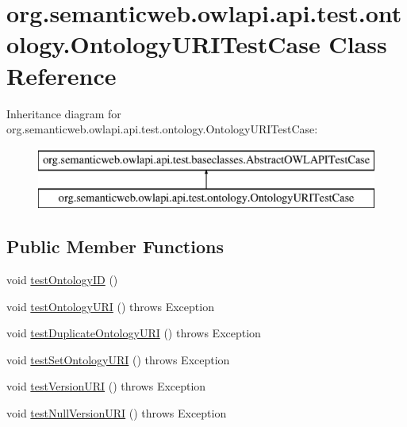 \hypertarget{classorg_1_1semanticweb_1_1owlapi_1_1api_1_1test_1_1ontology_1_1_ontology_u_r_i_test_case}{\section{org.\-semanticweb.\-owlapi.\-api.\-test.\-ontology.\-Ontology\-U\-R\-I\-Test\-Case Class Reference}
\label{classorg_1_1semanticweb_1_1owlapi_1_1api_1_1test_1_1ontology_1_1_ontology_u_r_i_test_case}
}
Inheritance diagram for org.\-semanticweb.\-owlapi.\-api.\-test.\-ontology.\-Ontology\-U\-R\-I\-Test\-Case\-:\begin{figure}[H]
\begin{center}
\leavevmode
\includegraphics[height=2.000000cm]{classorg_1_1semanticweb_1_1owlapi_1_1api_1_1test_1_1ontology_1_1_ontology_u_r_i_test_case}
\end{center}
\end{figure}
\subsection*{Public Member Functions}
\begin{DoxyCompactItemize}
\item 
void \hyperlink{classorg_1_1semanticweb_1_1owlapi_1_1api_1_1test_1_1ontology_1_1_ontology_u_r_i_test_case_a6630c2b5a17ec50983d86ae2e6690acd}{test\-Ontology\-I\-D} ()
\item 
void \hyperlink{classorg_1_1semanticweb_1_1owlapi_1_1api_1_1test_1_1ontology_1_1_ontology_u_r_i_test_case_a1107a0be38634b09862d8e9b27982f42}{test\-Ontology\-U\-R\-I} ()  throws Exception 
\item 
void \hyperlink{classorg_1_1semanticweb_1_1owlapi_1_1api_1_1test_1_1ontology_1_1_ontology_u_r_i_test_case_aa3c99614f62bbc47699d7daf16360b32}{test\-Duplicate\-Ontology\-U\-R\-I} ()  throws Exception 
\item 
void \hyperlink{classorg_1_1semanticweb_1_1owlapi_1_1api_1_1test_1_1ontology_1_1_ontology_u_r_i_test_case_ab7ccf88509b11733fcb7cf8c8ca10abe}{test\-Set\-Ontology\-U\-R\-I} ()  throws Exception 
\item 
void \hyperlink{classorg_1_1semanticweb_1_1owlapi_1_1api_1_1test_1_1ontology_1_1_ontology_u_r_i_test_case_acc1755185d9f9eb8d285679ff40fec7e}{test\-Version\-U\-R\-I} ()  throws Exception 
\item 
void \hyperlink{classorg_1_1semanticweb_1_1owlapi_1_1api_1_1test_1_1ontology_1_1_ontology_u_r_i_test_case_aaeffa8cde610a1a9fa78b9e2c714fbff}{test\-Null\-Version\-U\-R\-I} ()  throws Exception 
\end{DoxyCompactItemize}
